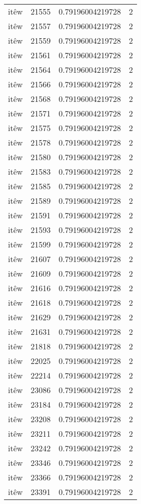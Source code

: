 \begin{longtable}{llll}
itêw & 21555 & 0.79196004219728 & 2\\
itêw & 21557 & 0.79196004219728 & 2\\
itêw & 21559 & 0.79196004219728 & 2\\
itêw & 21561 & 0.79196004219728 & 2\\
itêw & 21564 & 0.79196004219728 & 2\\
itêw & 21566 & 0.79196004219728 & 2\\
itêw & 21568 & 0.79196004219728 & 2\\
itêw & 21571 & 0.79196004219728 & 2\\
itêw & 21575 & 0.79196004219728 & 2\\
itêw & 21578 & 0.79196004219728 & 2\\
itêw & 21580 & 0.79196004219728 & 2\\
itêw & 21583 & 0.79196004219728 & 2\\
itêw & 21585 & 0.79196004219728 & 2\\
itêw & 21589 & 0.79196004219728 & 2\\
itêw & 21591 & 0.79196004219728 & 2\\
itêw & 21593 & 0.79196004219728 & 2\\
itêw & 21599 & 0.79196004219728 & 2\\
itêw & 21607 & 0.79196004219728 & 2\\
itêw & 21609 & 0.79196004219728 & 2\\
itêw & 21616 & 0.79196004219728 & 2\\
itêw & 21618 & 0.79196004219728 & 2\\
itêw & 21629 & 0.79196004219728 & 2\\
itêw & 21631 & 0.79196004219728 & 2\\
itêw & 21818 & 0.79196004219728 & 2\\
itêw & 22025 & 0.79196004219728 & 2\\
itêw & 22214 & 0.79196004219728 & 2\\
itêw & 23086 & 0.79196004219728 & 2\\
itêw & 23184 & 0.79196004219728 & 2\\
itêw & 23208 & 0.79196004219728 & 2\\
itêw & 23211 & 0.79196004219728 & 2\\
itêw & 23242 & 0.79196004219728 & 2\\
itêw & 23346 & 0.79196004219728 & 2\\
itêw & 23366 & 0.79196004219728 & 2\\
itêw & 23391 & 0.79196004219728 & 2\\

\end{longtable}

